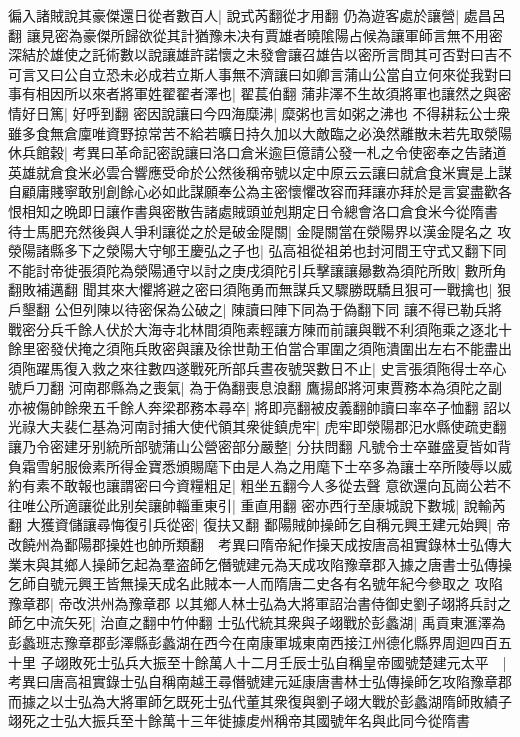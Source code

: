 徧入諸賊說其豪傑還日從者數百人|{
	說式芮翻從才用翻}
仍為遊客處於讓營|{
	處昌呂翻}
讓見密為豪傑所歸欲從其計猶豫未决有賈雄者曉隂陽占候為讓軍師言無不用密深結於雄使之託術數以說讓雄許諾懷之未發會讓召雄告以密所言問其可否對曰吉不可言又曰公自立恐未必成若立斯人事無不濟讓曰如卿言蒲山公當自立何來從我對曰事有相因所以來者將軍姓翟翟者澤也|{
	翟萇伯翻}
蒲非澤不生故須將軍也讓然之與密情好日篤|{
	好呼到翻}
密因說讓曰今四海糜沸|{
	糜粥也言如粥之沸也}
不得耕耘公士衆雖多食無倉廩唯資野掠常苦不給若曠日持久加以大敵臨之必渙然離散未若先取滎陽休兵館穀|{
	考異曰革命記密說讓曰洛口倉米逾巨億請公發一札之令使密奉之告諸道英雄就倉食米必雲合響應受命於公然後稱帝號以定中原云云讓曰就倉食米實是上謀自顧庸賤寧敢别創餘心必如此謀願奉公為主密懷懼改容而拜讓亦拜於是言宴盡歡各恨相知之晩即日讓作書與密散告諸處賊頭並剋期定日令總會洛口倉食米今從隋書}
待士馬肥充然後與人爭利讓從之於是破金隄關|{
	金隄關當在滎陽界以漢金隄名之}
攻滎陽諸縣多下之滎陽大守郇王慶弘之子也|{
	弘高祖從祖弟也封河間王守式又翻下同}
不能討帝徙張須陀為滎陽通守以討之庚戌須陀引兵擊讓讓曏數為須陀所敗|{
	數所角翻敗補邁翻}
聞其來大懼將避之密曰須陁勇而無謀兵又驟勝既驕且狠可一戰擒也|{
	狠戶墾翻}
公但列陳以待密保為公破之|{
	陳讀曰陣下同為于偽翻下同}
讓不得已勒兵將戰密分兵千餘人伏於大海寺北林間須陁素輕讓方陳而前讓與戰不利須陁乘之逐北十餘里密發伏掩之須陁兵敗密與讓及徐世勣王伯當合軍圍之須陁潰圍出左右不能盡出須陁躍馬復入救之來往數四遂戰死所部兵晝夜號哭數日不止|{
	史言張須陁得士卒心號戶刀翻}
河南郡縣為之喪氣|{
	為于偽翻喪息浪翻}
鷹揚郎將河東賈務本為須陀之副亦被傷帥餘衆五千餘人奔梁郡務本尋卒|{
	將即亮翻被皮義翻帥讀曰率卒子恤翻}
詔以光祿大夫裴仁基為河南討捕大使代領其衆徙鎮虎牢|{
	虎牢即滎陽郡汜水縣使疏吏翻}
讓乃令密建牙别統所部號蒲山公營密部分嚴整|{
	分扶問翻}
凡號令士卒雖盛夏皆如背負霜雪躬服儉素所得金寶悉頒賜麾下由是人為之用麾下士卒多為讓士卒所陵辱以威約有素不敢報也讓謂密曰今資糧粗足|{
	粗坐五翻今人多從去聲}
意欲還向瓦崗公若不往唯公所適讓從此别矣讓帥輜重東引|{
	重直用翻}
密亦西行至康城說下數城|{
	說輸芮翻}
大獲資儲讓尋悔復引兵從密|{
	復扶又翻}
鄱陽賊帥操師乞自稱元興王建元始興|{
	帝改饒州為鄱陽郡操姓也帥所類翻　考異曰隋帝紀作操天成按唐高祖實錄林士弘傳大業末與其鄉人操師乞起為羣盗師乞僭號建元為天成攻陷豫章郡入據之唐書士弘傳操乞師自號元興王皆無操天成名此賊本一人而隋唐二史各有名號年紀今參取之}
攻陷豫章郡|{
	帝改洪州為豫章郡}
以其鄉人林士弘為大將軍詔治書侍御史劉子翊將兵討之師乞中流矢死|{
	治直之翻中竹仲翻}
士弘代統其衆與子翊戰於彭蠡湖|{
	禹貢東滙澤為彭蠡班志豫章郡彭澤縣彭蠡湖在西今在南康軍城東南西接江州德化縣界周迴四百五十里}
子翊敗死士弘兵大振至十餘萬人十二月壬辰士弘自稱皇帝國號楚建元太平　|{
	考異曰唐高祖實錄士弘自稱南越王尋僭號建元延康唐書林士弘傳操師乞攻陷豫章郡而據之以士弘為大將軍師乞既死士弘代董其衆復與劉子翊大戰於彭蠡湖隋師敗績子翊死之士弘大振兵至十餘萬十三年徙據䖍州稱帝其國號年名與此同今從隋書}
